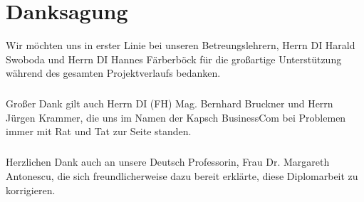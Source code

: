 \chapter{Danksagung}
Wir möchten uns in erster Linie bei unseren Betreungslehrern, Herrn DI Harald Swoboda und Herrn DI Hannes Färberböck für die großartige Unterstützung während des gesamten Projektverlaufs bedanken.
\paragraph*{}
Großer Dank gilt auch Herrn DI (FH) Mag. Bernhard Bruckner und Herrn Jürgen Krammer, die uns im Namen der Kapsch BusinessCom bei Problemen immer mit Rat und Tat zur Seite standen.
\paragraph*{}
Herzlichen Dank auch an unsere Deutsch Professorin, Frau Dr. Margareth Antonescu, die sich freundlicherweise dazu bereit erklärte, diese Diplomarbeit zu korrigieren.

